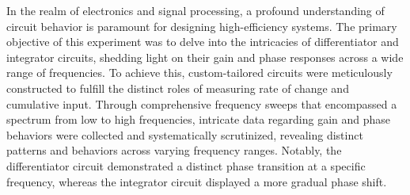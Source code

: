\abstract
In the realm of electronics and signal processing, a profound understanding of circuit behavior is paramount for designing high-efficiency systems. 
The primary objective of this experiment was to delve into the intricacies of differentiator and integrator circuits, shedding light on their gain and phase responses across a wide range of frequencies. 
To achieve this, custom-tailored circuits were meticulously constructed to fulfill the distinct roles of measuring rate of change and cumulative input. 
Through comprehensive frequency sweeps that encompassed a spectrum from low to high frequencies, intricate data regarding gain and phase behaviors were collected and systematically scrutinized, 
revealing distinct patterns and behaviors across varying frequency ranges. 
Notably, the differentiator circuit demonstrated a distinct phase transition at a specific frequency, whereas the integrator circuit displayed a more gradual phase shift. \\	